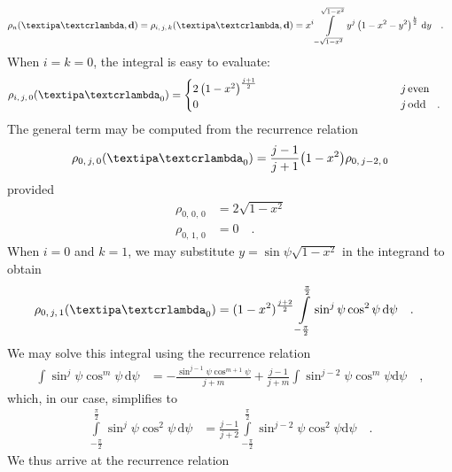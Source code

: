 \documentclass[modern]{aastex631}
\begin{document}
%
\begin{align}
    \label{eq:kT:sTexpression}
    \rho_n(\lnlam, \Dargs)
     & =
    \rho_{i,\,j,\,k}(\lnlam, \Dargs)
    =
    x^i
    \int\limits_{-\sqrt{1 - x^2}}^
    {\sqrt{1 - x^2}}
    y^j
    \left(1 - x^2 - y^2\right)^{\frac{k}{2}} \,
    \mathrm{d}y
    \quad .
\end{align}
%
When $i = k = 0$, the integral is easy to evaluate:
%
\begin{align}
    \rho_{i,\,j,\,0}(\lnlam_0)
     & =
    \begin{cases}
        2 \left( 1 - x^2 \right)^\frac{j + 1}{2}
        \quad\quad\quad\quad\quad\quad\quad\quad\quad\quad\quad\quad
          & j \, \mathrm{even}        \\
        0 & j \, \mathrm{odd} \quad .
    \end{cases}
\end{align}
%
The general term may be computed from the recurrence relation
%
\begin{align}
    \rho_{0,\,j,\,0}(\lnlam_0) = \frac{j - 1}{j + 1} \big(1 - x^2\big) \rho_{0,\,j-2,\,0}
\end{align}
%
provided
%
\begin{align}
    \rho_{0,\,0,\,0} & = 2 \sqrt{1-x^2} \nonumber \\
    \rho_{0,\,1,\,0} & = 0 \quad.
\end{align}
%
When $i = 0$ and $k = 1$, we may substitute $y = \sin\psi\sqrt{1 - x^2}$ in the integrand to obtain
%
\begin{align}
    \rho_{0,\,j,\,1}(\lnlam_0)
     & =
    (1 - x^2)^{\frac{j + 2}{2}}
    \int\limits_{-\frac{\pi}{2}}^{\frac{\pi}{2}}
    \sin^j\psi
    \cos^2\psi \,
    \mathrm{d}\psi
    \quad.
\end{align}
%
We may solve this integral using the recurrence relation
%
\begin{align}
    \int
    \sin^j\psi
    \cos^m\psi \,
    \mathrm{d}\psi
     & =
    -\frac{\sin^{j-1}\psi \cos^{m+1}\psi}{j + m}
    +
    \frac{j - 1}{j + m}\int\sin^{j-2}\psi \cos^m\psi \mathrm{d}\psi
    \quad ,
\end{align}
%
which, in our case, simplifies to
%
\begin{align}
    \int\limits_{-\frac{\pi}{2}}^{\frac{\pi}{2}}
    \sin^j\psi
    \cos^2\psi \,
    \mathrm{d}\psi
     & =
    \frac{j - 1}{j + 2}\int\limits_{-\frac{\pi}{2}}^
    {\frac{\pi}{2}}\sin^{j-2}\psi \cos^2\psi \mathrm{d}\psi
    \quad.
\end{align}
%
We thus arrive at the recurrence relation
\end{document}
